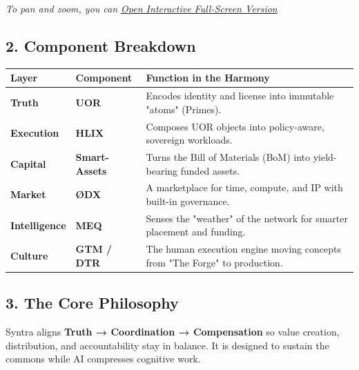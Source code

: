 \documentclass[12pt,a4paper]{article}
\begin{document}
{\emph{To pan and zoom, you can
\href{https://mermaid.live/edit\#pako:eNqNUstuwjAQ_BVrTy0S9AGHqAptpUqqIqQe6sUHs8GWsY3spm0R_r0OBA6I8mZ7Z3dmZ7y5pZpTgk3pTzUTrZqW9nSbeXfM89lq492Fp-f-yXU9-S6999Lp-Uff9_6k78pP74e-6_vuvNis_fN24_u-7883_t0u9O_b9_99_3L_D79X779W6836mP02XW7D6-m4P_Xv_rI_9-67P3Xv_rI_9-65v-z_B8_7-vD9zMof1YRyB_uYcM0YI2L8t4-SshN9DNRgK1I5A1PBOVMCt0p12qOqZcQatR9Aka6FMo0xW7N6N7K_hR6O8mR3S5f63YpQ6iB6xH_7KCk70ceX7XW86TqR6f-Y-rX_Ag9B7y4}{Open
Interactive Full-Screen Version}}}

\subsection{2. Component Breakdown}\label{component-breakdown}

{\def\LTcaptype{none} %
\begin{longtable}[]{@{}lll@{}}
\toprule\noalign{}
Layer & Component & Function in the Harmony \\
\midrule\noalign{}
\endhead
\bottomrule\noalign{}
\endlastfoot
\textbf{Truth} & \textbf{UOR} & Encodes identity and license into
immutable "atoms" (Primes). \\
\textbf{Execution} & \textbf{HLIX} & Composes UOR objects into
policy-aware, sovereign workloads. \\
\textbf{Capital} & \textbf{Smart-Assets} & Turns the Bill of Materials
(BoM) into yield-bearing funded assets. \\
\textbf{Market} & \textbf{ØDX} & A marketplace for time, compute, and IP
with built-in governance. \\
\textbf{Intelligence} & \textbf{MEQ} & Senses the "weather" of the
network for smarter placement and funding. \\
\textbf{Culture} & \textbf{GTM / DTR} & The human execution engine
moving concepts from "The Forge" to production. \\
\end{longtable}
}

\subsection{3. The Core Philosophy}\label{the-core-philosophy}

Syntra aligns \textbf{Truth → Coordination → Compensation} so value
creation, distribution, and accountability stay in balance. It is
designed to sustain the commons while AI compresses cognitive work.
\end{document}
